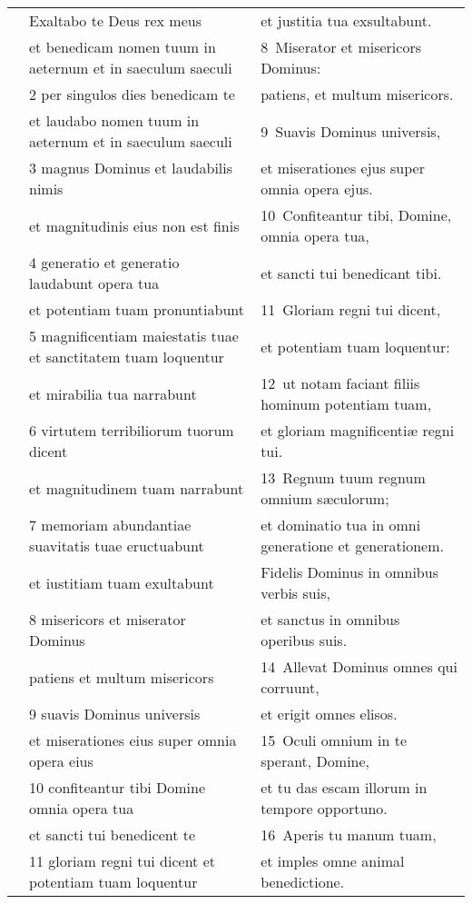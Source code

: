 \documentclass{article}
\begin{document}
\begin{longtable}{@{}p{}p{}p{}@{}}
	&	Exaltabo te Deus rex meus	&	et justitia tua exsultabunt.	\\
	&	et benedicam nomen tuum in aeternum et in saeculum saeculi	&	8 Miserator et misericors Dominus:	\\
	&	2 per singulos dies benedicam te	&	patiens, et multum misericors.	\\
	&	et laudabo nomen tuum in aeternum et in saeculum saeculi	&	9 Suavis Dominus universis,	\\
	&	3 magnus Dominus et laudabilis nimis	&	et miserationes ejus super omnia opera ejus.	\\
	&	et magnitudinis eius non est finis	&	10 Confiteantur tibi, Domine, omnia opera tua,	\\
	&	4 generatio et generatio laudabunt opera tua	&	et sancti tui benedicant tibi.	\\
	&	et potentiam tuam pronuntiabunt	&	11 Gloriam regni tui dicent,	\\
	&	5 magnificentiam maiestatis tuae et sanctitatem tuam loquentur	&	et potentiam tuam loquentur:	\\
	&	et mirabilia tua narrabunt	&	12 ut notam faciant filiis hominum potentiam tuam,	\\
	&	6 virtutem terribiliorum tuorum dicent	&	et gloriam magnificentiæ regni tui.	\\
	&	et magnitudinem tuam narrabunt	&	13 Regnum tuum regnum omnium sæculorum;	\\
	&	7 memoriam abundantiae suavitatis tuae eructuabunt	&	et dominatio tua in omni generatione et generationem.	\\
	&	et iustitiam tuam exultabunt	&	Fidelis Dominus in omnibus verbis suis,	\\
	&	8 misericors et miserator Dominus	&	et sanctus in omnibus operibus suis.	\\
	&	patiens et multum misericors	&	14 Allevat Dominus omnes qui corruunt,	\\
	&	9 suavis Dominus universis	&	et erigit omnes elisos.	\\
	&	et miserationes eius super omnia opera eius	&	15 Oculi omnium in te sperant, Domine,	\\
	&	10 confiteantur tibi Domine omnia opera tua	&	et tu das escam illorum in tempore opportuno.	\\
	&	et sancti tui benedicent te	&	16 Aperis tu manum tuam,	\\
	&	11 gloriam regni tui dicent et potentiam tuam loquentur	&	et imples omne animal benedictione.	\\

\end{longtable}
\end{document}
